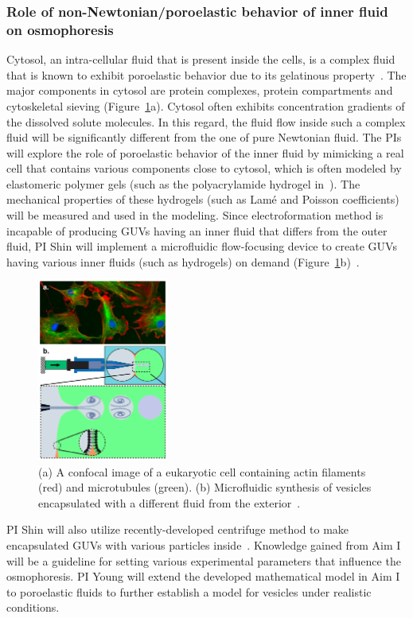 \documentclass[11pt]{article}
\begin{document}
\subsubsection{Role of non-Newtonian/poroelastic behavior of inner fluid on osmophoresis \label{subsubsec:Role_Non-Newtonian_Behavior}}
Cytosol, an intra-cellular fluid that is present inside the cells, is a
complex fluid that is known to exhibit poroelastic behavior due to its
gelatinous property~\cite{zhou2013,moeendarbary2013}. The major
components in cytosol are protein complexes, protein compartments and
cytoskeletal sieving (Figure~\ref{fig:ConfocalImage}a).  Cytosol often
exhibits concentration gradients of the dissolved solute molecules.  In
this regard, the fluid flow inside such a complex fluid will be
significantly different from the one of pure Newtonian fluid. The PIs
will explore the role of poroelastic behavior of the inner fluid by
mimicking a real cell that contains various components close to cytosol,
which is often modeled by elastomeric polymer gels (such as the
polyacrylamide hydrogel in~\cite{MacMinn2016_PRApplied,
Bertrand2016_PRApplied}).  The mechanical properties of these hydrogels
(such as Lam\'e and Poisson coefficients) will be measured and used in
the modeling. Since electroformation method is incapable of producing
GUVs having an inner fluid that differs from the outer fluid, PI Shin
will implement a microfluidic flow-focusing device to create GUVs having
various inner fluids (such as hydrogels) on demand
(Figure~\ref{fig:ConfocalImage}b)~\cite{stachowiak2008}. 
\begin{figure}
\vspace*{-7pt}
\centerline{\includegraphics[width=1.7in]{figs/ConfocalImage.pdf}}
\vspace*{-8pt}
\caption{\label{fig:ConfocalImage} \footnotesize (a) A confocal image of
  a eukaryotic cell containing actin filaments (red) and microtubules
  (green).  (b) Microfluidic synthesis of vesicles encapsulated with a
  different fluid from the exterior~\cite{stachowiak2008}.}
\end{figure}
%
PI Shin  will also utilize recently-developed centrifuge method to make
encapsulated GUVs with various particles inside~\cite{natsume2017}.
Knowledge gained from Aim I will be a guideline for setting various
experimental parameters that influence the osmophoresis. PI Young  will
extend the developed mathematical model in Aim I to poroelastic fluids
to further establish a model for vesicles under realistic conditions.
\end{document}
